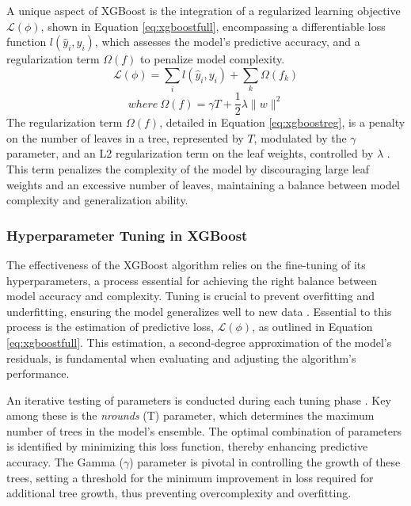 A unique aspect of XGBoost is the integration of a regularized learning objective \(\mathcal{L}(\phi)\), shown in Equation \ref{eq:xgboostfull}, encompassing a differentiable loss function $l(\hat{y}_i, y_i)$, which assesses the model's predictive accuracy, and a regularization term $\Omega(f)$ to penalize model complexity. 
\begin{equation}
\label{eq:xgboostfull}
    \mathcal{L}(\phi) = \sum_{i} l(\hat{y}_i, y_i) + \sum_{k} \Omega(f_k)
\end{equation}
\begin{equation}
\label{eq:xgboostreg}
    where \: \Omega(f) = \gamma T + \frac{1}{2} \lambda \| w \|^2
\end{equation}
The regularization term $\Omega(f)$, detailed in Equation \ref{eq:xgboostreg}, is a penalty on the number of leaves in a tree, represented by $T$, modulated by the $\gamma$ parameter, and an L2 regularization term on the leaf weights, controlled by $\lambda$ \parencite{Chen:2016:XST:2939672.2939785}. This term penalizes the complexity of the model by discouraging large leaf weights and an excessive number of leaves, maintaining a balance between model complexity and generalization ability.


\subsubsection{Hyperparameter Tuning in XGBoost} \label{sec:hyptuningxgboost}

The effectiveness of the XGBoost algorithm relies on the fine-tuning of its hyperparameters, a process essential for achieving the right balance between model accuracy and complexity. Tuning is crucial to prevent overfitting and underfitting, ensuring the model generalizes well to new data \parencite{Chen:2016:XST:2939672.2939785}. Essential to this process is the estimation of predictive loss, \(\mathcal{L}(\phi)\), as outlined in Equation \ref{eq:xgboostfull}. This estimation, a second-degree approximation of the model's residuals, is fundamental when evaluating and adjusting the algorithm's performance.

\clearpage

An iterative testing of parameters is conducted during each tuning phase \parencite{witten2013introduction}. Key among these is the \textit{nrounds} (T) parameter, which determines the maximum number of trees in the model's ensemble. The optimal combination of parameters is identified by minimizing this loss function, thereby enhancing predictive accuracy. The Gamma (\(\gamma\)) parameter is pivotal in controlling the growth of these trees, setting a threshold for the minimum improvement in loss required for additional tree growth, thus preventing overcomplexity and overfitting.

